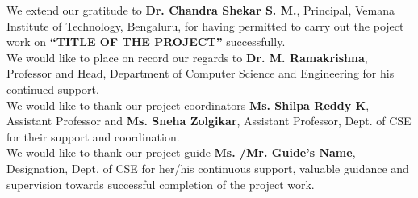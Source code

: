 \documentclass[12pt,a4paper]{article}
\begin{document}
\noindent We extend our gratitude to \textbf{Dr. Chandra Shekar S. M.}, Principal, Vemana Institute of Technology, Bengaluru, for having permitted to carry out the poject work on \textbf{“TITLE OF THE PROJECT”} successfully.
\\

\noindent We would like to place on record our regards to \textbf{Dr. M. Ramakrishna}, Professor and Head, Department of Computer Science and Engineering for his continued support. \\[3mm]

\noindent We would like to thank our project coordinators \textbf{Ms. Shilpa Reddy K}, Assistant Professor and \textbf{Ms. Sneha Zolgikar}, Assistant Professor, Dept. of CSE for their support and coordination. \\[3mm]

\noindent We would like to thank our project guide \textbf{Ms. /Mr. Guide’s Name}, Designation, Dept. of CSE for her/his continuous support, valuable guidance and supervision towards successful completion of the project work.\\[3mm]
\end{document}
